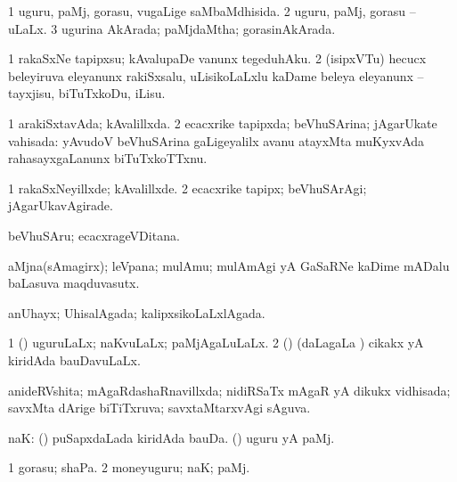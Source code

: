 {\bentry
{} 
\gl{\gu}
\bmng
\bnum
\num{1} uguru, paMj, gorasu, \mo vugaLige saMbaMdhisida. 
\num{2} uguru, paMj, gorasu -- uLaLx. 
\num{3} ugurina AkArada; paMjdaMtha; gorasinAkArada. 
\enum
\emng
\eentry

\bentry
{} 
\gl{\sakirx}
\expl{}
\bmng
\bnum
\num{1} rakaSxNe tapipxsu; kAvalupaDe \mo vanunx tegeduhAku. 
\num{2} (isipxVTu) hecucx beleyiruva eleyanunx rakiSxsalu, uLisikoLaLxlu kaDame beleya eleyanunx -- tayxjisu, biTuTxkoDu, iLisu. 
\enum
\emng
\eentry

\bentry
{} 
\gl{\gu}
\expl{}
\bmng
\bnum
\num{1} arakiSxtavAda; kAvalillxda. 
\num{2} ecacxrike tapipxda; beVhuSArina; jAgarUkate vahisada:  yAvudoV beVhuSArina gaLigeyalilx avanu atayxMta muKyxvAda rahasayxgaLanunx biTuTxkoTTxnu. 
\enum
\emng
\eentry

\bentry
{} 
\gl{\kirxvi}
\expl{}
\bmng
\bnum
\num{1} rakaSxNeyillxde; kAvalillxde. 
\num{2} ecacxrike tapipx; beVhuSArAgi; jAgarUkavAgirade. 
\enum
\emng
\eentry

\bentry
{} 
\gl{\nA}
\expl{}
\bmng
 beVhuSAru; ecacxrageVDitana. 
\emng
\eentry

\bentry
{} 
\gl{\nA}
\expl{}
\bmng
 aMjna(sAmagirx); leVpana; mulAmu; mulAmAgi yA GaSaRNe kaDime mADalu baLasuva maqduvasutx. 
\emng
\eentry

\bentry
{} 
\gl{\gu}
\expl{}
\bmng
 anUhayx; UhisalAgada; kalipxsikoLaLxlAgada. 
\emng
\eentry



\bentry
{} 
\gl{\gu}
\expl{}
\bmng
\bnum
\num{1} (\pArxparx) uguruLaLx; naKvuLaLx; paMjAgaLuLaLx. 
\num{2} (\savi) (daLagaLa \vi) cikakx yA kiridAda bauDavuLaLx. 
\enum
\emng
\eentry

\bentry
{} 
\gl{\gu}
\expl{}
\bmng
anideRVshita; mAgaRdashaRnavillxda; nidiRSaTx mAgaR yA dikukx vidhisada; savxMta dArige biTiTxruva; savxtaMtarxvAgi sAguva. 
\emng
\eentry

\bentry
{} 
\gl{\nA}
\bmng
naK: 
\banum
{} (\savi) puSapxdaLada kiridAda bauDa. 
 (\pArxvi) uguru yA paMj. 
\eanum
\emng
\eentry

\bentry
{} 
\gl{\nA}
\bmng
\bnum
\num{1} gorasu; shaPa. 
\num{2} moneyuguru; naK; paMj. 
\enum
\emng
\eentry

}
